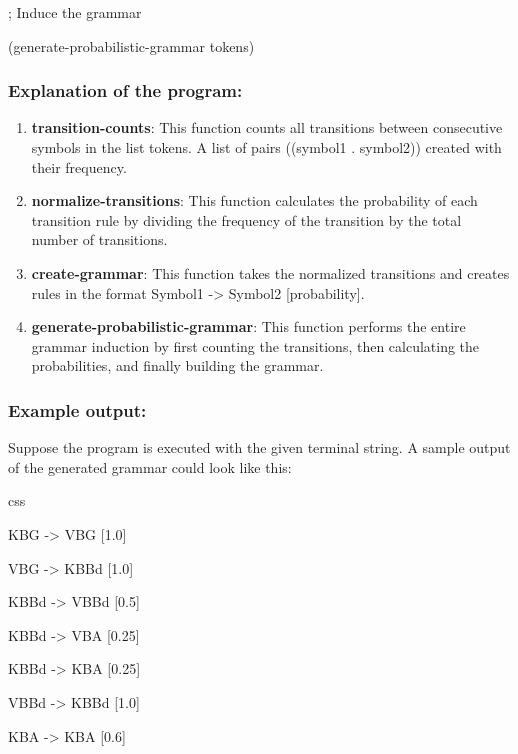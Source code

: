 \documentclass[
]{article}
\begin{document}
; Induce the grammar

(generate-probabilistic-grammar tokens)

\subsubsection{\texorpdfstring{\textbf{Explanation of the
program:}}{Explanation of the program:}}\label{explanation-of-the-program}

\begin{enumerate}
\def\labelenumi{\arabic{enumi}.}
\item
  \textbf{transition-counts}: This function counts all transitions
  between consecutive symbols in the list tokens. A list of pairs
  ((symbol1 . symbol2)) created with their frequency.
\item
  \textbf{normalize-transitions}: This function calculates the
  probability of each transition rule by dividing the frequency of the
  transition by the total number of transitions.
\item
  \textbf{create-grammar}: This function takes the normalized
  transitions and creates rules in the format Symbol1 -\textgreater{}
  Symbol2 {[}probability{]}.
\item
  \textbf{generate-probabilistic-grammar}: This function performs the
  entire grammar induction by first counting the transitions, then
  calculating the probabilities, and finally building the grammar.
\end{enumerate}

\subsubsection{\texorpdfstring{\textbf{Example
output:}}{Example output:}}\label{example-output}

Suppose the program is executed with the given terminal string. A sample
output of the generated grammar could look like this:

css

KBG -\textgreater{} VBG {[}1.0{]}

VBG -\textgreater{} KBBd {[}1.0{]}

KBBd -\textgreater{} VBBd {[}0.5{]}

KBBd -\textgreater{} VBA {[}0.25{]}

KBBd -\textgreater{} KBA {[}0.25{]}

VBBd -\textgreater{} KBBd {[}1.0{]}

KBA -\textgreater{} KBA {[}0.6{]}
\end{document}
